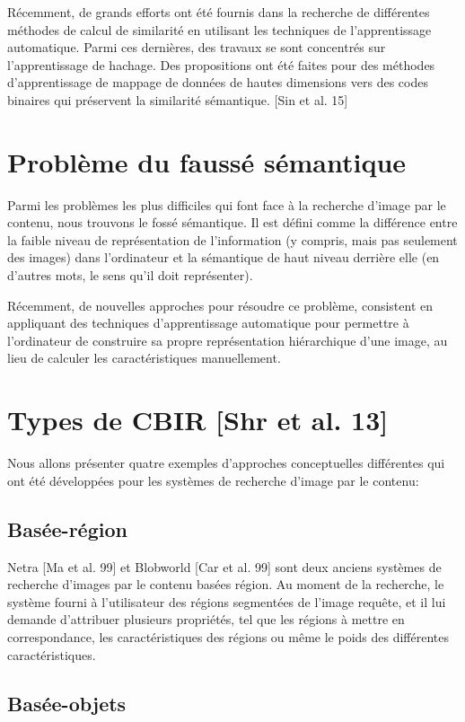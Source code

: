 	Récemment, de grands efforts ont été fournis dans la recherche de différentes méthodes de calcul de similarité en utilisant les techniques de l'apprentissage automatique. Parmi ces dernières, des travaux se sont concentrés sur l'apprentissage de hachage. Des propositions ont été faites pour des méthodes d'apprentissage de mappage de données de hautes dimensions vers des codes binaires qui préservent la similarité sémantique. [Sin et al. 15]

\section{Problème du faussé sémantique}

	Parmi les problèmes  les plus difficiles qui font face à la recherche d'image par le contenu, nous trouvons le fossé sémantique. Il est défini comme la différence entre la faible niveau de représentation de l'information (y compris, mais pas seulement des images) dans l'ordinateur et la sémantique de haut niveau derrière elle (en d'autres mots, le sens qu'il doit représenter).
	
	Récemment, de nouvelles approches pour résoudre ce problème, consistent en appliquant des techniques d'apprentissage automatique pour permettre à l'ordinateur de construire sa propre représentation hiérarchique d'une image, au lieu de calculer les caractéristiques manuellement.


\section{Types de CBIR [Shr et al. 13]}

	Nous allons présenter quatre exemples d'approches conceptuelles différentes qui ont été développées pour les systèmes de recherche d'image par le contenu:

\subsection{Basée-région}

	Netra [Ma et al. 99] et Blobworld [Car et al. 99] sont deux anciens systèmes de recherche d'images par le contenu basées région. Au moment de la recherche, le système fourni à l'utilisateur des régions segmentées de l'image requête, et il lui demande d'attribuer plusieurs propriétés, tel que les régions à mettre en correspondance, les caractéristiques des régions ou même le poids des différentes caractéristiques.


\subsection{Basée-objets}
	
